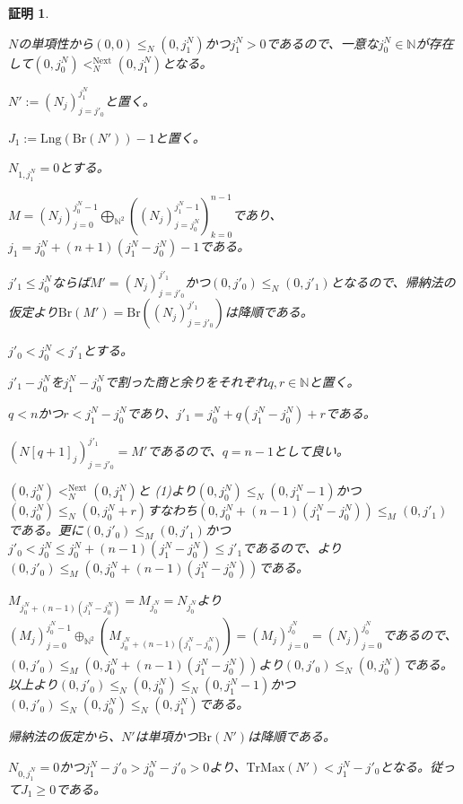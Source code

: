 \documentclass[dvipdfmx,uplatex]{jsarticle}
\theoremstyle{customnonumberbreakfortheorem}
\theoremstyle{customnonumberbreakforproof}
\newtheorem{hideableproof}{証明}
\begin{document}
\begin{hideableproof}
\begin{indented}
\begin{indented}
			\item \(N\)の単項性から\((0,0) \leq_N (0,j_1^N)\)かつ\(j_1^N > 0\)であるので、一意な\(j_0^N \in \mathbb{N}\)が存在して\((0,j_0^N) <_N^{\textrm{Next}} (0,j_1^N)\)となる。
			\item \(N' := (N_j)_{j=j'_0}^{j_1^N}\)と置く。
			\item \(J_1 := \textrm{Lng}(\textrm{Br}(N'))-1\)と置く。
			\item
			\item \(N_{1,j_1^N} = 0\)とする。
			\begin{indented}
				\item \(M = (N_j)_{j=0}^{j_0^N-1} \bigoplus_{\mathbb{N}^2} ((N_j)_{j=j_0^N}^{j_1^N-1})_{k=0}^{n-1}\)であり、\(j_1 = j_0^N+(n+1)(j_1^N-j_0^N)-1\)である。
				\item \(j'_1 \leq j_0^N\)ならば\(M' = (N_j)_{j=j'_0}^{j'_1}\)かつ\((0,j'_0) \leq_N (0,j'_1)\)となるので、帰納法の仮定より\(\textrm{Br}(M') = \textrm{Br}((N_j)_{j=j'_0}^{j'_1})\)は降順である。
				\item \(j'_0 < j_0^N < j'_1\)とする。
				\begin{indented}
					\item \(j'_1-j_0^N\)を\(j_1^N-j_0^N\)で割った商と余りをそれぞれ\(q,r \in \mathbb{N}\)と置く。
					\item \(q < n\)かつ\(r < j_1^N-j_0^N\)であり、\(j'_1 = j_0^N+q(j_1^N-j_0^N)+r\)である。
					\item \((N[q+1]_j)_{j=j'_0}^{j'_1} = M'\)であるので、\(q = n-1\)として良い。
					\item \((0,j_0^N) <_N^{\textrm{Next}} (0,j_1^N)\)と (1)より\((0,j_0^N) \leq_N (0,j_1^N-1)\)かつ\((0,j_0^N) \leq_N (0,j_0^N+r)\)すなわち\((0,j_0^N+(n-1)(j_1^N-j_0^N)) \leq_M (0,j'_1)\)である。更に\((0,j'_0) \leq_M (0,j'_1)\)かつ\(j'_0 < j_0^N \leq j_0^N+(n-1)(j_1^N-j_0^N) \leq j'_1\)であるので、より\((0,j'_0) \leq_M (0,j_0^N+(n-1)(j_1^N-j_0^N))\)である。
					\item \(M_{j_0^N+(n-1)(j_1^N-j_0^N)} = M_{j_0^N} = N_{j_0^N}\)より\((M_j)_{j=0}^{j_0^N-1} \oplus_{\mathbb{N}^2} (M_{j_0^N+(n-1)(j_1^N-j_0^N)}) = (M_j)_{j=0}^{j_0^N} = (N_j)_{j=0}^{j_0^N}\)であるので、\((0,j'_0) \leq_M (0,j_0^N+(n-1)(j_1^N-j_0^N))\)より\((0,j'_0) \leq_N (0,j_0^N)\)である。以上より\((0,j'_0) \leq_N (0,j_0^N) \leq_N (0,j_1^N-1)\)かつ\((0,j'_0) \leq_N (0,j_0^N) \leq_N (0,j_1^N)\)である。
					\item 帰納法の仮定から、\(N'\)は単項かつ\(\textrm{Br}(N')\)は降順である。
					\item \(N_{0,j_1^N} = 0\)かつ\(j_1^N-j'_0 > j_0^N-j'_0 > 0\)より、\(\textrm{TrMax}(N') < j_1^N-j'_0\)となる。従って\(J_1 \geq 0\)である。

\end{indented}
\end{indented}
\end{indented}
\end{indented}
\end{hideableproof}
\end{document}
